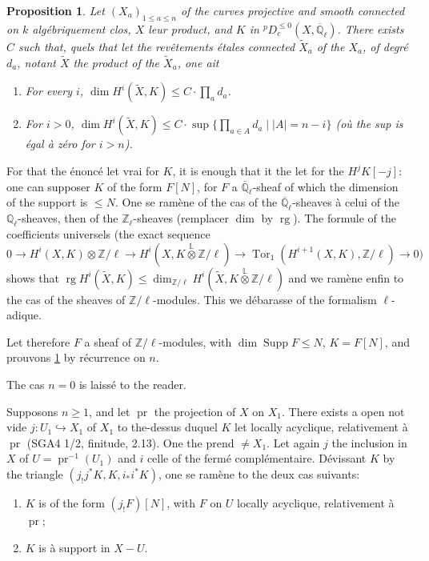 \documentclass[12pt,a4paper]{article}
\theoremstyle{plain}
\newtheorem{proposition}[theorem]{Proposition}
\theoremstyle{definition}
\DeclareMathOperator{\Supp}{Supp}
\DeclareMathOperator{\Tor}{Tor}
\DeclareMathOperator{\rg}{rg}
\newcommand{\into}{\hookrightarrow}
\providecommand{\pr}{\operatorname{pr}}
\begin{document}
{{\begin{proposition}\label{prop:4.5.1}
Let $(X_{a})_{1 \leq a \leq n}$ of the curves projective and smooth connected on $k$ alg\'{e}briquement clos, $X$ leur product, and $K$ in ${}^{p}D_{c}^{\leq 0}(X,\overline{\mathbb{Q}}_{\ell})$. There exists $C$ such that, quels that let the rev\^{e}tements \'{e}tales connected $\tilde{X}_{a}$ of the $X_{a}$, of degr\'{e} $d_{a}$, notant $\tilde{X}$ the product of the $\tilde{X}_{a}$, one ait
\begin{enumerate}
\item[(i)] For every $i$, $\dim H^{i}(\tilde{X}, K) \leq C \cdot \prod_{a} d_{a}$.
\item[(ii)] For $i > 0$, $\dim H^{i}(\tilde{X}, K) \leq C \cdot \sup\{\prod_{a \in A} d_{a} \mid |A| = n-i\}$ (o\`{u} the sup is \'{e}gal \`{a} z\'{e}ro for $i > n$).
\end{enumerate}
\end{proposition}

For that the \'{e}nonc\'{e} let vrai for $K$, it is enough that it the let for the $H^{j}K[-j]$: one can supposer $K$ of the form $F[N]$, for $F$ a $\overline{\mathbb{Q}}_{\ell}$-sheaf of which the dimension of the support is $\leq N$. One se ram\`{e}ne of the cas of the $\overline{\mathbb{Q}}_{\ell}$-sheaves \`{a} celui of the $\mathbb{Q}_{\ell}$-sheaves, then of the $\mathbb{Z}_{\ell}$-sheaves (remplacer $\dim$ by $\rg$). The formule of the coefficients universels (the exact sequence
\[
0 \longrightarrow H^{i}(X,K) \otimes \mathbb{Z}/\ell \longrightarrow H^{i}(X, K \overset{\mathbb{L}}{\otimes} \mathbb{Z}/\ell) \longrightarrow \Tor_{1}(H^{i+1}(X,K), \mathbb{Z}/\ell) \longrightarrow 0)
\]
shows that $\rg H^{i}(\tilde{X},K) \leq \dim_{\mathbb{Z}/\ell} H^{i}(\tilde{X}, K \overset{\mathbb{L}}{\otimes} \mathbb{Z}/\ell)$ and we ram\`{e}ne enfin to the cas of the sheaves of $\mathbb{Z}/\ell$-modules. This we d\'{e}barasse of the formalism $\ell$-adique.

Let therefore $F$ a sheaf of $\mathbb{Z}/\ell$-modules, with $\dim \Supp F \leq N$, $K = F[N]$, and prouvons \ref{prop:4.5.1} by r\'{e}currence on $n$.

The cas $n = 0$ is laiss\'{e} to the reader.

Supposons $n \geq 1$, and let $\pr$ the projection of $X$ on $X_{1}$. There exists a open not vide $j: U_{1} \into X_{1}$ of $X_{1}$ to the-dessus duquel $K$ let locally acyclique, relativement \`{a} $\pr$ (SGA4 1/2, finitude, 2.13). One the prend $\neq X_{1}$. Let again $j$ the inclusion in $X$ of $U = \pr^{-1}(U_{1})$ and $i$ celle of the ferm\'{e} compl\'{e}mentaire. D\'{e}vissant $K$ by the triangle $(j_{!}j^{*}K, K, i_{*}i^{*}K)$, one se ram\`{e}ne to the deux cas suivants:
\begin{enumerate}
\item[(a)] $K$ is of the form $(j_{!}F)[N]$, with $F$ on $U$ locally acyclique, relativement \`{a} $\pr$;
\item[(b)] $K$ is \`{a} support in $X-U$.
\end{enumerate}

}}
\end{document}
